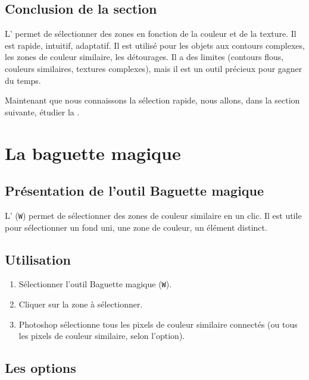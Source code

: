 \subsection*{Conclusion de la section}

L' permet de sélectionner des zones en fonction de la couleur et de la texture. Il est rapide, intuitif, adaptatif. Il est utilisé pour les objets aux contours complexes, les zones de couleur similaire, les détourages. Il a des limites (contours flous, couleurs similaires, textures complexes), mais il est un outil précieux pour gagner du temps.

Maintenant que nous connaissons la sélection rapide, nous allons, dans la section suivante, étudier la .

\section{La baguette magique}

\subsection{Présentation de l'outil Baguette magique}

L' (\texttt{W}) permet de sélectionner des zones de couleur similaire en un clic. Il est utile pour sélectionner un fond uni, une zone de couleur, un élément distinct.

\subsection{Utilisation}

\begin{enumerate}
    \item Sélectionner l'outil Baguette magique (\texttt{W}).
    \item Cliquer sur la zone à sélectionner.
    \item Photoshop sélectionne tous les pixels de couleur similaire connectés (ou tous les pixels de couleur similaire, selon l'option).
\end{enumerate}

\subsection{Les options}

